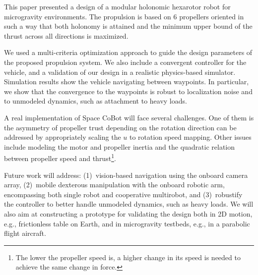 
This paper presented a design of a modular holonomic hexarotor robot
for microgravity environments. The propulsion is based on 6 propellers
oriented in such a way that both holonomy is attained and the minimum
upper bound of the thrust across all directions is maximized. 

We used a multi-criteria optimization approach to guide the design parameters of the proposed propulsion system. We also include a convergent controller for the vehicle, and a validation of our design in a realistic physics-based simulator. Simulation results show the vehicle navigating between waypoints. In particular, we show that the convergence to the waypoints is robust to localization noise and to unmodeled dynamics, such as attachment to heavy loads.

A real implementation of Space CoBot will face several challenges. One
of them is the asymmetry of propeller trust depending on the rotation
direction can be addressed by appropriately scaling the $u$ to
rotation speed mapping. Other issues include modeling the motor and
propeller inertia and the quadratic relation between propeller speed
and thrust\footnote{The lower the propeller speed is, a higher change
  in its speed is needed to achieve the same change in force.}.

Future work will address: (1)~vision-based navigation using the onboard camera array, (2)~mobile dexterous manipulation with the onboard robotic arm, encompassing both single robot and cooperative multirobot, and (3)~robustify the controller to better handle unmodeled dynamics, such as heavy loads. We will also aim at constructing a prototype for validating the design both in 2D motion, e.g., frictionless table on Earth, and in microgravity testbeds, e.g., in a parabolic flight aircraft.

